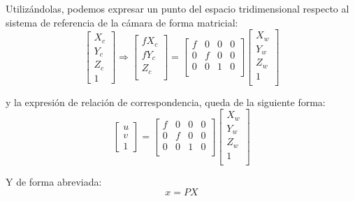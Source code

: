 Utilizándolas, podemos expresar un punto del espacio tridimensional respecto al sistema de referencia de la cámara de forma matricial:
\begin{equation} 
  \begin{bmatrix}
    X_{c} \\
    Y_{c} \\
    Z_{c} \\
    1
  \end{bmatrix}
  \Longrightarrow
  \begin{bmatrix}
    fX_{c} \\
    fY_{c} \\
    Z_{c} \\
  \end{bmatrix}
  =
  \begin{bmatrix} f & 0 & 0 & 0 \\ 0 & f & 0 & 0 \\ 0 & 0 & 1 & 0 \\\end{bmatrix}
  \begin{bmatrix} X_{w} \\  Y_{w} \\  Z_{w} \\  1 \\\end{bmatrix}
\end{equation}

y la expresión de relación de correspondencia, queda de la siguiente forma:
\begin{equation} 
  \begin{bmatrix}
    u \\
    v \\
    1
  \end{bmatrix}
  =
  \begin{bmatrix} f & 0 & 0 & 0 \\ 0 & f & 0 & 0 \\ 0 & 0 & 1 & 0 \\\end{bmatrix}
  \begin{bmatrix} X_{w} \\  Y_{w} \\  Z_{w} \\  1 \\\end{bmatrix}
\end{equation}

Y de forma abreviada:
\begin{equation}\label{eq:proy}
  x = P X   
\end{equation}

